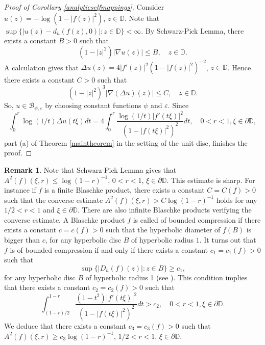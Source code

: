 \documentclass[11pt,letterpaper]{amsart}
\theoremstyle{definition}
\newtheorem{rem}{Remark}[section]
\numberwithin{equation}{section}
\newcommand{\D}{\mathbb D}
\begin{document}
\begin{proof}[Proof of Corollary \ref{analyticselfmappings}]
Consider $u(z) = -\log (1- |f(z)|^2)$, $ z \in \D$. Note that $\sup \{ |u(z) - d_h (f(z), 0)| : z \in \D \} < \infty$. By  Schwarz-Pick Lemma, there exists a constant $B>0$ such that  
$$
(1- |z|^2) |\nabla u (z)| \leq B , \quad z \in \D . 
$$
A calculation gives that $\Delta u (z) = 4 |f'(z)|^2 (1- |f(z)|^2)^{-2}$, $z \in \D$. Hence there exists a constant $C>0$ such that 
$$
(1-|z|^2)^3 |\nabla (\Delta u) (z)| \leq C, \quad z \in \D . 
$$
So, $u \in \mathcal{B}_{\psi , \varepsilon }$ by choosing constant functions $\psi $ and $\varepsilon $. Since
$$
\int_{0}^r \log (1/t) \Delta u( t \xi) dt=  4 \int_0^r \frac{\log (1/t) |f' (t \xi)|^2}{ (1- |f (t \xi)|^2)^2} dt , \quad 0<r<1, \xi \in \partial \D,
$$
part (a) of Theorem \ref{maintheorem} in the setting of the unit disc, finishes the proof. 
\end{proof}

\begin{rem}\label{blaschke}
Note that Schwarz-Pick Lemma gives that $A^2 (f) (\xi, r) \leq \log (1-r)^{-1} $, $0<r<1$, $\xi \in \partial \D$. This estimate is sharp. For instance if $f$ is a finite Blaschke product, there exists a constant $C=C(f) >0$ such that the converse estimate $A^2 (f) (\xi , r) > C \log (1-r)^{-1}$ holds for any $1/2 <r<1$ and $\xi \in \partial \D$. There are also infinite Blaschke products verifying the converse estimate. A Blaschke product $f$ is called of bounded compression if there exists a constant $c = c(f) >0$ such that the hyperbolic diameter of $f(B)$ is bigger than $c$, for any hyperbolic disc $B$ of hyperbolic radius $1$. It turns out that $f$ is of bounded compression if and only if there exists a constant $c_1= c_1 (f) >0$ such that 
$$
\sup \{ |D_h (f) (z)| : z \in B  \} \geq c_1,
$$
for any hyperbolic disc $B$ of hyperbolic radius 1 (see \cite{IN}). This condition implies that there exists a constant $c_2 = c_2 (f) >0$ such that
$$
\int_{(1-r)/2 }^{1-r} \frac{(1- t^2) |f' (t \xi)|^2}{ (1- |f (t \xi)|^2)^2} dt > c_2, \quad 0<r<1, \xi \in \partial \D . 
$$
We deduce that there exists a constant $c_3 = c_3 (f) >0$ such that $A^2 (f) (\xi , r) \geq c_3 \log (1-r)^{-1}$, $1/2 <r<1$, $\xi \in \partial \D$. 
\end{rem}
\end{document}
